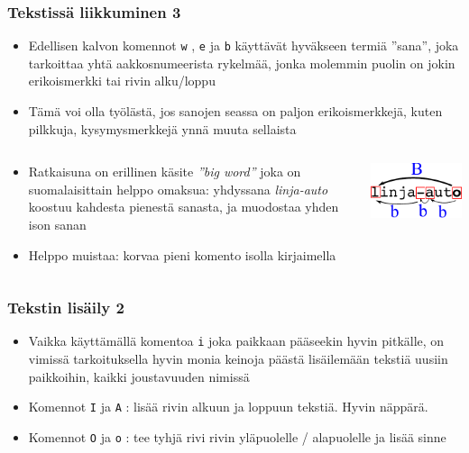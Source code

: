 \documentclass[]{beamer}
\newcommand{\Tohj}[1]{\texttt{#1}}
\newcommand{\com}[1]{{\color{blue!50!black}\Tohj{#1}} \!\!}
\begin{document}
\begin{frame}
    \frametitle{Tekstissä liikkuminen 3}
    \begin{itemize}
        \item Edellisen kalvon komennot \com{w}, \com{e} ja \com{b} käyttävät hyväkseen termiä ''sana'', joka tarkoittaa yhtä aakkosnumeerista rykelmää, jonka molemmin puolin on jokin erikoismerkki tai rivin alku/loppu
        \pause 
        \item Tämä voi olla työlästä, jos sanojen seassa on paljon erikoismerkkejä, kuten pilkkuja, kysymysmerkkejä ynnä muuta sellaista
        \pause
    \end{itemize}
        \begin{columns}
        \begin{column}{0.7\textwidth}
            \begin{itemize}
            \item Ratkaisuna on erillinen käsite \emph{''big word''} joka on suomalaisittain helppo omaksua: yhdyssana \emph{linja-auto} koostuu kahdesta pienestä sanasta, ja muodostaa yhden ison sanan
            \item Helppo muistaa: korvaa pieni komento isolla kirjaimella
            \end{itemize}
        \end{column}
        \begin{column}{0.2\textwidth}
            \includegraphics[width=\textwidth] {vi_bigword}
        \end{column}
        \end{columns}
\end{frame}

\begin{frame}
    \frametitle{Tekstin lisäily 2}
    \begin{itemize}
        \item Vaikka käyttämällä komentoa \com{i} joka paikkaan pääseekin hyvin pitkälle, on vimissä tarkoituksella hyvin monia keinoja päästä lisäilemään tekstiä uusiin paikkoihin, kaikki joustavuuden nimissä
        \item Komennot \com{I} ja \com{A}: lisää rivin alkuun ja loppuun tekstiä. Hyvin näppärä.
        \pause
        \item Komennot \com{O} ja \com{o}: tee tyhjä rivi rivin yläpuolelle / alapuolelle ja lisää sinne
    \end{itemize}
\end{frame}
\end{document}
